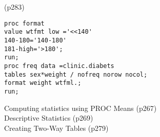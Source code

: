 (p283)
\begin{framed}
\begin{verbatim}
proc format
value wtfmt low ='<<140'
140-180='140-180'
181-high='>180';
run;
proc freq data =clinic.diabets
tables sex*weight / nofreq norow nocol;
format weight wtfml.;
run;
\end{verbatim}
\end{framed}


Computing statistics using PROC Means (p267)\\
Descriptive Statistics (p269)\\
Creating Two-Way Tables (p279)\\

